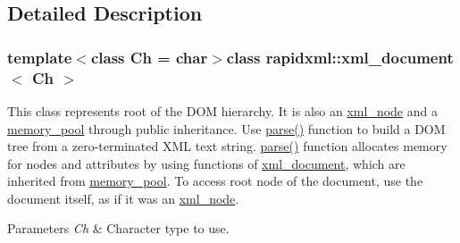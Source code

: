 \subsection{Detailed Description}
\subsubsection*{template$<$class Ch = char$>$class rapidxml\+::xml\+\_\+document$<$ Ch $>$}

This class represents root of the D\+O\+M hierarchy. It is also an \hyperlink{singletonrapidxml_1_1xml__node}{xml\+\_\+node} and a \hyperlink{classrapidxml_1_1memory__pool}{memory\+\_\+pool} through public inheritance. Use \hyperlink{singletonrapidxml_1_1xml__document_ac6e73ff9ac323bf5a370c38feb03a6b1}{parse()} function to build a D\+O\+M tree from a zero-\/terminated X\+M\+L text string. \hyperlink{singletonrapidxml_1_1xml__document_ac6e73ff9ac323bf5a370c38feb03a6b1}{parse()} function allocates memory for nodes and attributes by using functions of \hyperlink{singletonrapidxml_1_1xml__document}{xml\+\_\+document}, which are inherited from \hyperlink{classrapidxml_1_1memory__pool}{memory\+\_\+pool}. To access root node of the document, use the document itself, as if it was an \hyperlink{singletonrapidxml_1_1xml__node}{xml\+\_\+node}. 
\begin{DoxyParams}{Parameters}
{\em Ch} & Character type to use. \\
\hline
\end{DoxyParams}


